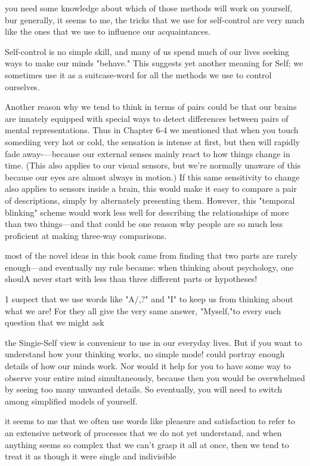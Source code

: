 \documentclass[10pt,a4paper]{article}
\begin{document}
you need some knowledge about which of those methods will work on yourself, bur generally, it seems to me, the tricks that we use for self-control are very much like the ones that we use to influence our acquaintances. \cite[p.~312]{minsky}

Self-control is no simple skill, and many of us spend much of our lives seeking ways to make our minds "behave." This suggests yet another meaning for Self; we sometimes use it as a suitcase-word for all the methods we use to control ourselves. \cite[p.~313]{minsky}

Another reason why we tend to think in terms of pairs could be that our brains are innately equipped with special ways to detect differences between pairs of mental representations. Thus in Chapter 6-4 we mentioned that when you touch somediing very hot or cold, the sensation is intense at first, but then will rapidly fade away-—because our external senses mainly react to how things change in time. (This also applies to our visual sensors, but we're normally unaware of this because our eyes are almost always in motion.) If this same sensitivity to change also applies to sensors inside a brain, this would make it easy to compare a pair of descriptions, simply by alternately presenting them. However, this "temporal blinking" scheme would work less well for describing the relationships of more than two things—and that could be one reason why people are so much less proficient at making three-way comparisons. \cite[p.~317]{minsky}

most of the novel ideas in this book came from finding that two parts are rarely enough—and eventually my rule became: when thinking about psychology, one shoulA never start with less than three different parts or hypotheses! \cite[p.~318]{minsky}

1 suspect that we use words like "A/,?" and "I" to keep us from thinking about what we are! For they all give the very same answer, "Myself,"to every such question that we might ask \cite[p.~320]{minsky}

the Singie-Self view is convenienr to use in our everyday lives. But if you want to understand how your thinking works, no simple mode! could portray enough details of how our minds work. Nor would it help for you to have some way to observe your entire mind simultaneously, because then you would be overwhelmed by seeing too many unwanted details. So eventually, you will need to switch among simplified models of yourself. \cite[p.~321]{minsky}

it seems to me that we often use words like pleasure and satisfaction to refer to an extensive network of processes that we do not yet understand, and when anything seems so complex that we can't grasp it all at once, then we tend to treat it as though it were single and indivisible \cite[p.~323]{minsky}
\end{document}
